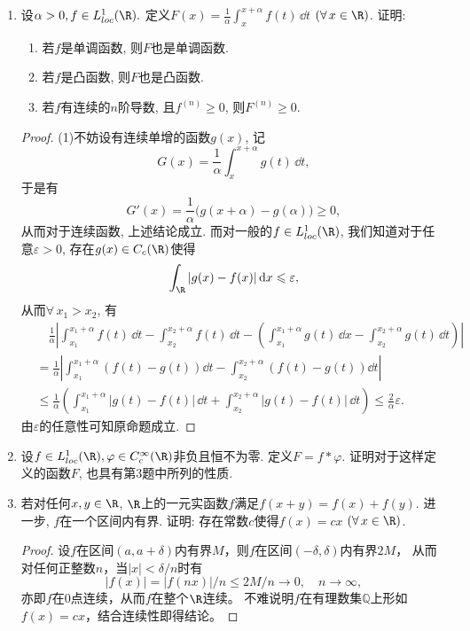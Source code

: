 \begin{quiza}
\begin{enumerate}
\item 设\(\alpha>0,f\in L_{loc}^1(\R).\) 
定义\(F(x)=\frac{1}{\alpha}\int_{x}^{x+\alpha}f(t)\,\dd t\) \((\forall\, x\in\R)\). 
证明:\begin{enumerate}[label=(\arabic*)]
\item 若\(f\)是单调函数, 则\(F\)也是单调函数.
\item 若\(f\)是凸函数, 则\(F\)也是凸函数.
\item 若\(f\)有连续的\(n\)阶导数, 且\(f^{(n)}\geqslant 0\), 则\(F^{(n)}\geqslant 0\).
\end{enumerate}
\begin{proof}
	(1)不妨设有连续单增的函数\(g(x)\), 记
    \[G(x)=\frac{1}{\alpha}\int_{x}^{x+\alpha}g(t)\,\dd t,\]
    于是有
    \[G'(x)=\frac{1}{\alpha}\big(g(x+\alpha)-g(\alpha)\big)\geqslant 0,\]
    从而对于连续函数, 上述结论成立. 而对一般的\(f\in L_{loc}^1(\R)\), 
    我们知道对于任意\(\varepsilon>0\), 存在\(g(x)\in C_c(\R)\)使得
    \[\int_{\R}|g(x)-f(x)|\,\dd x\leqslant\varepsilon,\]
    从而\(\forall\, x_1>x_2\), 有\[\begin{split}
		&\quad\frac{1}{\alpha}\left|\int_{x_1}^{x_1+\alpha}f(t)\,\dd t
        -\int_{x_2}^{x_2+\alpha}f(t)\,\dd t-\left(\int_{x_1}^{x_1+\alpha}g(t)\,\dd x
        -\int_{x_2}^{x_2+\alpha}g(t)\,\dd t\right)\right|\\
		&=\frac{1}{\alpha}\left|\int_{x_1}^{x_1+\alpha}\left(f(t)-g(t)\right)\dd t
        -\int_{x_2}^{x_2+\alpha}\left(f(t)-g(t)\right)\dd t\right|\\
		&\leqslant\frac{1}{\alpha}\left(\int_{x_1}^{x_1+\alpha}|g(t)-f(t)|\,\dd t
        +\int_{x_2}^{x_2+\alpha}|g(t)-f(t)|\,\dd t\right)
        \leqslant\frac{2}{\alpha}\varepsilon.
	\end{split}\]
	由\(\varepsilon\)的任意性可知原命题成立.
\end{proof}

\item 设\(f\in L_{loc}^{1}(\R),\varphi\in C_{c}^{\infty}(\R)\)非负且恒不为零. 
定义\(F=f*\varphi\). 证明对于这样定义的函数\(F\), 也具有第3题中所列的性质.

\item 若对任何\(x,y\in\R\), \(\R\)上的一元实函数\(f\)满足\(f(x+y)=f(x)+f(y)\). 
进一步, \(f\)在一个区间内有界. 证明: 存在常数\(c\)使得\(f(x)=cx\) \((\forall\, x\in\R)\).
\begin{proof}
    设$f$在区间$(a,a+\delta)$内有界$M$，则$f$在区间$(-\delta,\delta)$内有界$2M$，
    从而对任何正整数$n$，当$|x|<\delta/n$时有
    \[|f(x)|=|f(nx)|/n \leqslant 2M/n\to0,\quad n\to\infty,\]
    亦即$f$在$0$点连续，从而$f$在整个$\R$连续。
    不难说明$f$在有理数集$\mathbb{Q}$上形如$f(x)=cx$，结合连续性即得结论。
\end{proof}
\end{enumerate}
\end{quiza}


